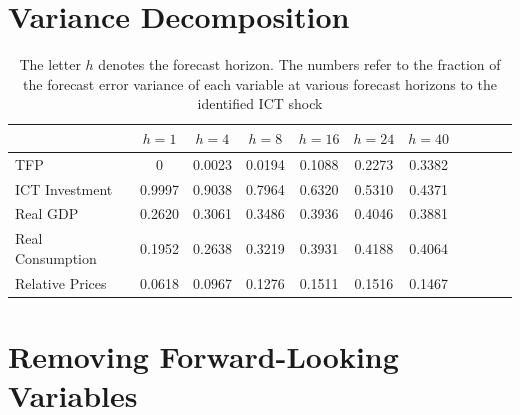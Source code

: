 \documentclass[12pt]{article}
\begin{document}
\newpage

 
 
 \section{Variance Decomposition}\label{section:vardec}

 
 
 	\begin{table}[h!]
 		\begin{center}
 \begin{tabular}{lcccccccccc}
\hline
 	& $h = 1$ & $h = 4$ & $h = 8$ & $h = 16$ & $h = 24$ & $h = 40$ \\
 	\hline
TFP &  0       &  0.0023  &  0.0194 &   0.1088 &   0.2273  &  0.3382 \\
ICT Investment &  0.9997  &  0.9038  &  0.7964 &   0.6320 &   0.5310  &  0.4371 \\
Real GDP &  0.2620  &  0.3061  &  0.3486 &   0.3936 &   0.4046  &  0.3881 \\
Real Consumption &  0.1952  &  0.2638  &  0.3219 &   0.3931 &   0.4188  &  0.4064 \\
Relative Prices &  0.0618  &  0.0967  &  0.1276 &   0.1511 &   0.1516  &  0.1467 \\	
\hline
 	\end{tabular}
  		\caption{The letter $h$ denotes the forecast horizon. The numbers refer to the fraction of the forecast error variance of each variable at various forecast horizons to the identified ICT shock}
  \label{table:vardec}
  \end{center}
 \end{table}

\newpage

 \section{Removing Forward-Looking Variables}\label{section:removing_FL_Var}
 
\end{document}
